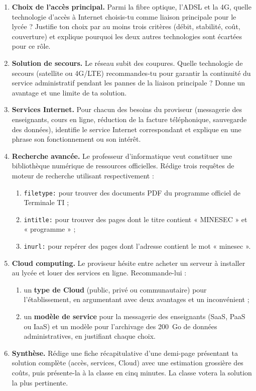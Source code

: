 \documentclass[11pt]{article}
\begin{document}
\begin{enumerate}
  \item \textbf{Choix de l'accès principal.} Parmi la fibre optique, l'ADSL et la 4G, quelle technologie d'accès à Internet choisis-tu comme liaison principale pour le lycée ? Justifie ton choix par au moins trois critères (débit, stabilité, coût, couverture) et explique pourquoi les deux autres technologies sont écartées pour ce rôle.
  \item \textbf{Solution de secours.} Le réseau subit des coupures. Quelle technologie de secours (satellite ou 4G/LTE) recommandes-tu pour garantir la continuité du service administratif pendant les pannes de la liaison principale ? Donne un avantage et une limite de ta solution.
  \item \textbf{Services Internet.} Pour chacun des besoins du proviseur (messagerie des enseignants, cours en ligne, réduction de la facture téléphonique, sauvegarde des données), identifie le service Internet correspondant et explique en une phrase son fonctionnement ou son intérêt.
  \item \textbf{Recherche avancée.} Le professeur d'informatique veut constituer une bibliothèque numérique de ressources officielles. Rédige trois requêtes de moteur de recherche utilisant respectivement :
  \begin{enumerate}
    \item \texttt{filetype:} pour trouver des documents PDF du programme officiel de Terminale TI ;
    \item \texttt{intitle:} pour trouver des pages dont le titre contient « MINESEC » et « programme » ;
    \item \texttt{inurl:} pour repérer des pages dont l'adresse contient le mot « minesec ».
  \end{enumerate}
  \item \textbf{Cloud computing.} Le proviseur hésite entre acheter un serveur à installer au lycée et louer des services en ligne. Recommande-lui :
  \begin{enumerate}
    \item un \textbf{type de Cloud} (public, privé ou communautaire) pour l'établissement, en argumentant avec deux avantages et un inconvénient ;
    \item un \textbf{modèle de service} pour la messagerie des enseignants (SaaS, PaaS ou IaaS) et un modèle pour l'archivage des \SI{200}{Go} de données administratives, en justifiant chaque choix.
  \end{enumerate}
  \item \textbf{Synthèse.} Rédige une fiche récapitulative d'une demi-page présentant ta solution complète (accès, services, Cloud) avec une estimation grossière des coûts, puis présente-la à la classe en cinq minutes. La classe votera la solution la plus pertinente.
\end{enumerate}
\end{document}

